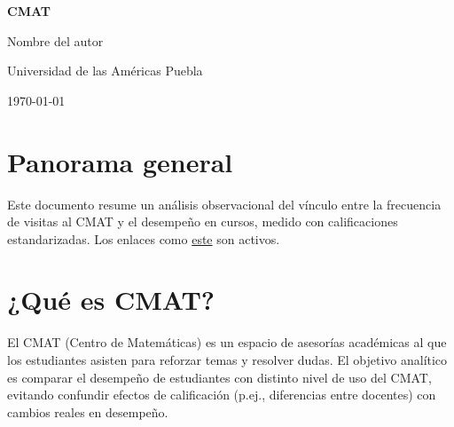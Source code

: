 \documentclass[8pt,a4paper]{article} %
\numberwithin{figure}{subsection}
\begin{document}
\begin{titlepage}
  \centering
  \vspace*{4cm}
  {\Huge\bfseries CMAT\par}
  \vspace{2cm}
  {\Large Nombre del autor\par}
  \vspace{1cm}
  {\large Universidad de las Américas Puebla\par}
  \vfill
  {\large \today\par}
\end{titlepage}

\begin{abstract}
Este documento describe un flujo de análisis para evaluar la asociación entre el uso del CMAT (Centro de Matemáticas) y el desempeño académico, usando calificaciones estandarizadas (Z-score) con imputación de valores faltantes mediante KDE (Kernel Density Estimation). Se presentan: (i) exploración de la distribución de visitas, (ii) tratamiento e imputación de calificaciones, (iii) evidencia de heterogeneidad entre docentes, (iv) análisis por salón y por estudiante con pruebas paramétricas y no paramétricas, e (v) visualizaciones agregadas con intervalos de confianza.
\end{abstract}

\tableofcontents
\thispagestyle{empty}
\newpage

\section{Panorama general}
Este documento resume un análisis observacional del vínculo entre la frecuencia de visitas al CMAT y el desempeño en cursos, medido con calificaciones estandarizadas. 
Los enlaces como \href{https://example.com}{este} son activos.


\newpage
\section{\texorpdfstring{¿Qué es CMAT?}{Que es CMAT?}}
El CMAT (Centro de Matemáticas) es un espacio de asesorías académicas al que los estudiantes asisten para reforzar temas y resolver dudas. 
El objetivo analítico es comparar el desempeño de estudiantes con distinto nivel de uso del CMAT, evitando confundir efectos de calificación (p.ej., diferencias entre docentes) con cambios reales en desempeño.
\end{document}
